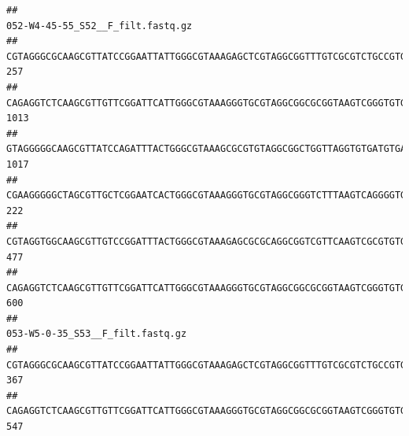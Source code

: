 \documentclass[]{article}
\begin{document}
\begin{verbatim}
##                                                                                                                                                                                                                                                           052-W4-45-55_S52__F_filt.fastq.gz
## CGTAGGGCGCAAGCGTTATCCGGAATTATTGGGCGTAAAGAGCTCGTAGGCGGTTTGTCGCGTCTGCCGTGAAAGTCCGGGGCTCAACTCCGGATCTGCGGTGGGTACGGGCAGACTAGAGTGATGTAGGGGAGACTGGAATTCCTGGTGTAGCGGTGAAATGCGCAGATATCAGGAGGAACACCGATGGCGAAGGCAGGTCTCTGGGCATTAACTGACGCTGAGGAGCGAAAGCATGGGGAGCGAACA                               257
## CAGAGGTCTCAAGCGTTGTTCGGATTCATTGGGCGTAAAGGGTGCGTAGGCGGCGCGGTAAGTCGGGTGTGAAATCTCGGAGCTTAACTCCGAAACTGCATTCGATACTGCCGTGCTTGAGGACTGGAGAGGAGACTGGAATTTACGGTGTAGCGGTGAAATGCGTAGATATCGTAAGGAAGACCAGTGGCGAAGGCGGGTCTCTGGACAGTTCCTGACGCTGAGGCACGAAGGCCAGGGGAGCAAACG                              1013
## GTAGGGGGCAAGCGTTATCCAGATTTACTGGGCGTAAAGCGCGTGTAGGCGGCTGGTTAGGTGTGATGTGAAATCTTCCGGCTCAACCGGAAAACTGCATTGCAAACCGGCCTGGCTAGAGTGCAGGAGAGGGAAGCGGAATTCCAGGTGTAGCGGTGAAATGCGTAGATATCTGGAGGAACACCAGTGGCGAAGGCGGCTTCCTGGCCTGCAACTGACGCTGAGACGCGAAAGCGTGGGGAGCGAAC                               1017
## CGAAGGGGGCTAGCGTTGCTCGGAATCACTGGGCGTAAAGGGTGCGTAGGCGGGTCTTTAAGTCAGGGGTGAAATCCTGGAGCTCAACTCCAGAACTGCCTTTGATACTGAAGATCTTGAGTTCGGGAGAGGTGAGTGGAACTGCGAGTGTAGAGGTGAAATTCGTAGATATTCGCAAGAACACCAGTGGCGAAGGCGGCTCACTGGCCCGATACTGACGCTGAGGCACGAAAGCGTGGGGAGCAAACA                               222
## CGTAGGTGGCAAGCGTTGTCCGGATTTACTGGGCGTAAAGAGCGCGCAGGCGGTCGTTCAAGTCGCGTGTGAAAGCCCCCGGCTCAACTGGGGAGGGTCACGCGATACTGATCGACTCGAAGGCAGGAGAGGGTAGTGGAATTCCCGGTGTAGTGGTGAAATGCGTAGATATCGGGAGGAACACCAGTGGCGAAGGCGACTACCTGGCCTGTTCTTGACGCTGAGGCGCGAAAGCTAGGGGAGCAAACG                               477
## CAGAGGTCTCAAGCGTTGTTCGGATTCATTGGGCGTAAAGGGTGCGTAGGCGGCGCGGTAAGTCGGGTGTGAAATCTCGGGGCTTAACTCCGAAACTGCATTCGATACTGCCGTGCTTGAGGACTGGAGAGGAGACTGGAATTTACGGTGTAGCGGTGAAATGCGTAGATATCGTAAGGAAGACCAGTGGCGAAGGCGGGTCTCTGGACAGTTCCTGACGCTGAGGCACGAAGGCCAGGGGAGCAAACG                               600
##                                                                                                                                                                                                                                                           053-W5-0-35_S53__F_filt.fastq.gz
## CGTAGGGCGCAAGCGTTATCCGGAATTATTGGGCGTAAAGAGCTCGTAGGCGGTTTGTCGCGTCTGCCGTGAAAGTCCGGGGCTCAACTCCGGATCTGCGGTGGGTACGGGCAGACTAGAGTGATGTAGGGGAGACTGGAATTCCTGGTGTAGCGGTGAAATGCGCAGATATCAGGAGGAACACCGATGGCGAAGGCAGGTCTCTGGGCATTAACTGACGCTGAGGAGCGAAAGCATGGGGAGCGAACA                              367
## CAGAGGTCTCAAGCGTTGTTCGGATTCATTGGGCGTAAAGGGTGCGTAGGCGGCGCGGTAAGTCGGGTGTGAAATCTCGGAGCTTAACTCCGAAACTGCATTCGATACTGCCGTGCTTGAGGACTGGAGAGGAGACTGGAATTTACGGTGTAGCGGTGAAATGCGTAGATATCGTAAGGAAGACCAGTGGCGAAGGCGGGTCTCTGGACAGTTCCTGACGCTGAGGCACGAAGGCCAGGGGAGCAAACG                              547

\end{verbatim}
\end{document}
